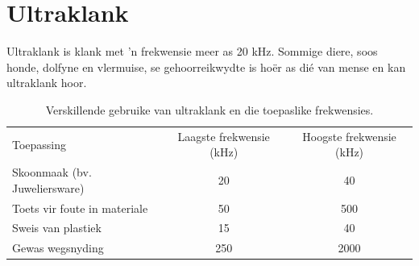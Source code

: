 \section{Ultraklank}
            \nopagebreak
Ultraklank is klank met 'n frekwensie meer as 20 kHz. Sommige diere, soos honde, dolfyne en vlermuise, se gehoorreikwydte is ho\"er as di\'e van mense en kan ultraklank hoor.
          \begin{table}[H]
        \begin{center}
      \begin{tabular}[t]{|l|c|c|}\hline
        Toepassing &
        Laagste frekwensie (kHz) &
        Hoogste frekwensie (kHz)%
     \tabularnewline\cline{1-1}\cline{2-2}\cline{3-3}
        Skoonmaak (bv. Juweliersware) &
        20 &
        40%
     \tabularnewline\cline{1-1}\cline{2-2}\cline{3-3}
        Toets vir foute in materiale &
        50 &
        500%
     \tabularnewline\cline{1-1}\cline{2-2}\cline{3-3}
        Sweis van plastiek &
        15 &
        40%
     \tabularnewline\cline{1-1}\cline{2-2}\cline{3-3}
     Gewas wegsnyding &
        250 &
        2000%
     \tabularnewline\cline{1-1}\cline{2-2}\cline{3-3}
    \end{tabular}
      \end{center}
    \caption{Verskillende gebruike van ultraklank en die toepaslike frekwensies.}
\end{table}
    \par
  \par 

